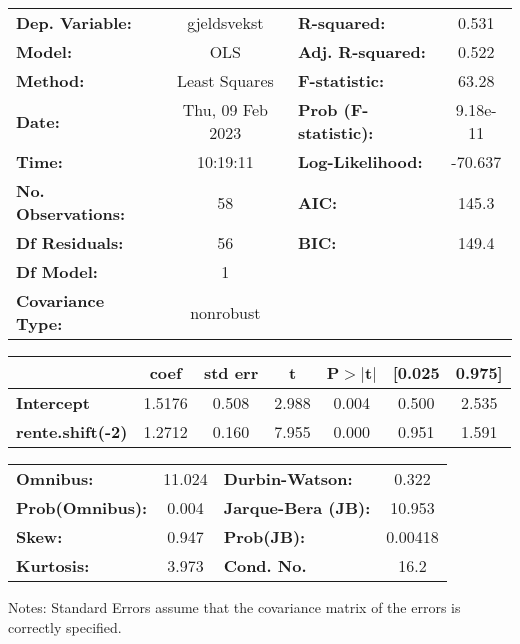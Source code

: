 \documentclass{report}
\begin{document}
\begin{center}
\begin{tabular}{lclc}
\toprule
\textbf{Dep. Variable:}    &   gjeldsvekst    & \textbf{  R-squared:         } &     0.531   \\
\textbf{Model:}            &       OLS        & \textbf{  Adj. R-squared:    } &     0.522   \\
\textbf{Method:}           &  Least Squares   & \textbf{  F-statistic:       } &     63.28   \\
\textbf{Date:}             & Thu, 09 Feb 2023 & \textbf{  Prob (F-statistic):} &  9.18e-11   \\
\textbf{Time:}             &     10:19:11     & \textbf{  Log-Likelihood:    } &   -70.637   \\
\textbf{No. Observations:} &          58      & \textbf{  AIC:               } &     145.3   \\
\textbf{Df Residuals:}     &          56      & \textbf{  BIC:               } &     149.4   \\
\textbf{Df Model:}         &           1      & \textbf{                     } &             \\
\textbf{Covariance Type:}  &    nonrobust     & \textbf{                     } &             \\
\bottomrule
\end{tabular}
\begin{tabular}{lcccccc}
                         & \textbf{coef} & \textbf{std err} & \textbf{t} & \textbf{P$> |$t$|$} & \textbf{[0.025} & \textbf{0.975]}  \\
\midrule
\textbf{Intercept}       &       1.5176  &        0.508     &     2.988  &         0.004        &        0.500    &        2.535     \\
\textbf{rente.shift(-2)} &       1.2712  &        0.160     &     7.955  &         0.000        &        0.951    &        1.591     \\
\bottomrule
\end{tabular}
\begin{tabular}{lclc}
\textbf{Omnibus:}       & 11.024 & \textbf{  Durbin-Watson:     } &    0.322  \\
\textbf{Prob(Omnibus):} &  0.004 & \textbf{  Jarque-Bera (JB):  } &   10.953  \\
\textbf{Skew:}          &  0.947 & \textbf{  Prob(JB):          } &  0.00418  \\
\textbf{Kurtosis:}      &  3.973 & \textbf{  Cond. No.          } &     16.2  \\
\bottomrule
\end{tabular}
\end{center}

Notes: \newline
 [1] Standard Errors assume that the covariance matrix of the errors is correctly specified.
\end{document}
